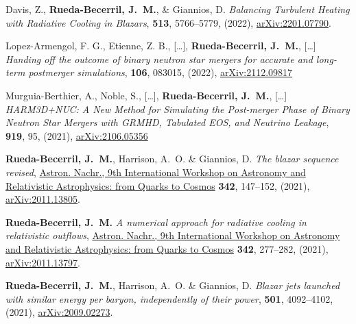 \begin{thebibliography}{99}
 Davis, Z., \textbf{Rueda-Becerril, J.~M.}, \& Giannios, D. \textit{Balancing Turbulent Heating with Radiative Cooling in Blazars}, \href{https://doi.org/10.1093/mnras/stac1282}{\mnras} \textbf{513}, 5766--5779, (2022), \href{https://arxiv.org/abs/2201.07790}{arXiv:2201.07790}.

 Lopez-Armengol, F. G., Etienne, Z. B., [\ldots], \textbf{Rueda-Becerril, J.~M.}, [\ldots] \textit{Handing off the outcome of binary neutron star mergers for accurate and long-term postmerger simulations}, \href{https://doi.org/10.1103/PhysRevD.106.083015}{\prd} \textbf{106}, 083015, (2022), \href{https://arxiv.org/abs/2112.09817}{arXiv:2112.09817}

 Murguia-Berthier, A., Noble, S., [\ldots], \textbf{Rueda-Becerril, J.~M.}, [\ldots] \textit{HARM3D+NUC: A New Method for Simulating the Post-merger Phase of Binary Neutron Star Mergers with GRMHD, Tabulated EOS, and Neutrino Leakage}, \href{https://doi.org/10.3847/1538-4357/ac1119}{\apj} \textbf{919}, 95, (2021), \href{https://arxiv.org/abs/2106.05356}{arXiv:2106.05356}

 \textbf{Rueda-Becerril, J.~M.}, Harrison, A.~O. \& Giannios, D. \emph{The blazar sequence revised}, \href{https://doi.org/10.1002/asna.202113919}{Astron. Nachr., 9th International Workshop on Astronomy and Relativistic Astrophysics: from Quarks to Cosmos} \textbf{342}, 147--152, (2021), \href{https://arxiv.org/abs/2011.13805}{arXiv:2011.13805}.

 \textbf{Rueda-Becerril, J.~M.} \emph{A numerical approach for radiative cooling in relativistic outflows}, \href{https://doi.org/10.1002/asna.202113919}{Astron. Nachr., 9th International Workshop on Astronomy and Relativistic Astrophysics: from Quarks to Cosmos} \textbf{342}, 277--282, (2021), \href{https://arxiv.org/abs/2011.13797}{arXiv:2011.13797}.

 \textbf{Rueda-Becerril, J.~M.}, Harrison, A.~O. \& Giannios, D. \textit{Blazar jets launched with similar energy per baryon, independently of their power}, \href{https://doi.org/10.1093/mnras/staa3925}{\mnras} \textbf{501}, 4092--4102, (2021), \href{https://arxiv.org/abs/2009.02273}{arXiv:2009.02273}.


\end{thebibliography}
